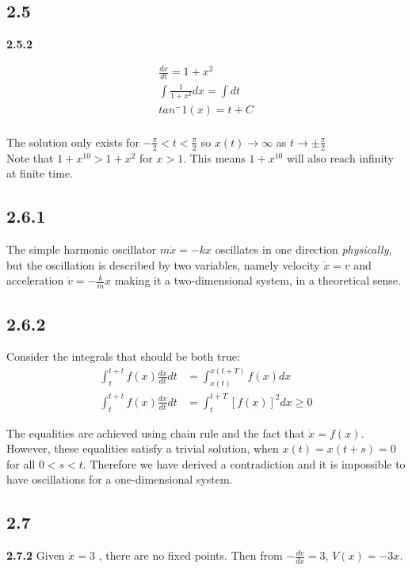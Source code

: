 \documentclass[]{article}
\begin{document}
	
	\subsection*{2.5}
	\textbf{2.5.2}
	
	\begin{align*}
	\frac{dx}{dt} = 1 + x^2\\
	\int \frac{1}{1  + x^2} dx = \int dt\\
	tan^-1(x) = t + C\\
	\end{align*}
	
	The solution only exists for $-\frac{\pi}{2} < t < \frac{\pi}{2}$ so $x(t) \rightarrow \infty$ as $t \rightarrow \pm\frac{\pi}{2}$\\
	Note that $1 + x^10 > 1 + x^2$ for $x > 1$. This means $1 + x^10$ will also reach infinity at finite time.\\
	
	\subsection*{2.6.1}
	The simple harmonic oscillator $m\ddot{x}=-kx$ oscillates in one direction \textit{physically}, but the oscillation is described by two variables, namely velocity $\dot{x}=v$ and acceleration $\dot{v}=-\frac{k}{m}x$ making it a two-dimensional system, in a theoretical sense.
	
	\subsection*{2.6.2}
	Consider the integrals that should be both true:
	\begin{align*}
	\int_{t}^{t+t} f(x)\frac{dx}{dt}dt &= \int_{x(t)}^{x(t+T)}f(x)dx\\
	\int_{t}^{t+t} f(x)\frac{dx}{dt}dt &= \int_{t}^{t+T}[f(x)]^2dx \geq 0
	\end{align*}
	
	The equalities are achieved using chain rule and the fact that $\dot{x}=f(x)$. However, these equalities satisfy a trivial solution, when $x(t)=x(t+s)=0 $ for all $0<s<t$. Therefore we have derived a contradiction and it is impossible to have oscillations for a one-dimensional system. \qedsymbol
	
	\subsection*{2.7}
	\textbf{2.7.2} Given $\dot{x} = 3$ , there are no fixed points. Then from $-\frac{dv}{dx} = 3$, $V(x) = -3x$.
	\\
	
\end{document}
